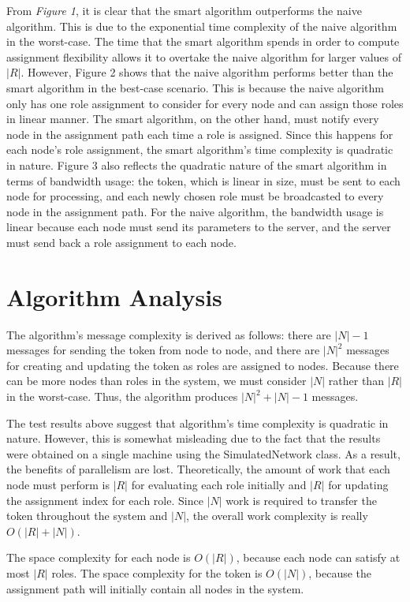 \documentclass[11pt]{article}
\begin{document}
\begin{multicols}{2}
From \textit{Figure 1}, it is clear that the smart algorithm outperforms the naive algorithm. This is due to the exponential time complexity of the naive algorithm in the worst-case. The time that the smart algorithm spends in order to compute assignment flexibility allows it to overtake the naive algorithm for larger values of $|R|$. However, Figure 2 shows that the naive algorithm performs better than the smart algorithm in the best-case scenario. This is because the naive algorithm only has one role assignment to consider for every node and can assign those roles in linear manner. The smart algorithm, on the other hand, must notify every node in the assignment path each time a role is assigned. Since this happens for each node's role assignment, the smart algorithm's time complexity is quadratic in nature. Figure 3 also reflects the quadratic nature of the smart algorithm in terms of bandwidth usage: the token, which is linear in size, must be sent to each node for processing, and each newly chosen role must be broadcasted to every node in the assignment path. For the naive algorithm, the bandwidth usage is linear because each node must send its parameters to the server, and the server must send back a role assignment to each node.
\section{Algorithm Analysis}
The algorithm's message complexity is derived as follows: there are $|N| - 1$ messages for sending the token from node to node, and there are $|N|^2$  messages for creating and updating the token as roles are assigned to nodes. Because there can be more nodes than roles in the system, we must consider $|N|$ rather than $|R|$ in the worst-case. Thus, the algorithm produces $|N|^2 + |N| - 1$ messages.

The test results above suggest that algorithm's time complexity is quadratic in nature. However, this is somewhat misleading due to the fact that the results were obtained on a single machine using the SimulatedNetwork class. As a result, the benefits of parallelism are lost. Theoretically, the amount of work that each node must perform is $|R|$ for evaluating each role initially and $|R|$ for updating the assignment index for each role. Since $|N|$ work is required to transfer the token throughout the system and $|N|$, the overall work complexity is really $O(|R| + |N|)$.

The space complexity for each node is $O(|R|)$, because each node can satisfy at most $|R|$ roles. The space complexity for the token is $O(|N|)$, because the assignment path will initially contain all nodes in the system.


\end{multicols}
\end{document}
